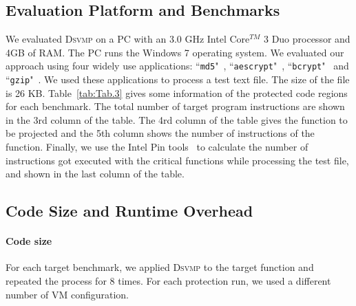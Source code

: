 \documentclass[preprint,12pt,3p]{elsarticle}
\newcommand{\DSVMP}{\textsc{Dsvmp}\xspace}
\begin{document}
\subsection{Evaluation Platform and Benchmarks}
We evaluated \DSVMP on a PC with an 3.0 GHz Intel Core$^{TM}$ 3 Duo processor and 4GB of RAM.
The PC runs the Windows 7 operating system. We evaluated our approach using four widely use applications: ``\texttt{md5}"~\cite{19md5}, ``\texttt{aescrypt}"~\cite{20Aescrypt}, ``\texttt{bcrypt}"~\cite{21bcrypt} and ``\texttt{gzip}"~\cite{22gzip}.
We used these applications to process a test text file. The size of the file is 26 KB.
Table~\ref{tab:Tab.3} gives some information of the protected code regions for each benchmark.
The total number of target program instructions are shown in the 3rd column of the table.
The 4rd column of the table gives the function to be projected
and the 5th column shows the number of instructions of the function.
Finally, we use the Intel Pin tools~\cite{pin} to calculate the number of instructions got executed with the critical functions
while processing the test file, and shown in the last column of the table.


\subsection{Code Size and Runtime Overhead}\label{sec:benchmarktest}
\paragraph*{Code size} For each target benchmark, we applied \DSVMP to the target function and repeated the process for 8 times.
For each protection run, we used a different number of VM configuration.
\end{document}
